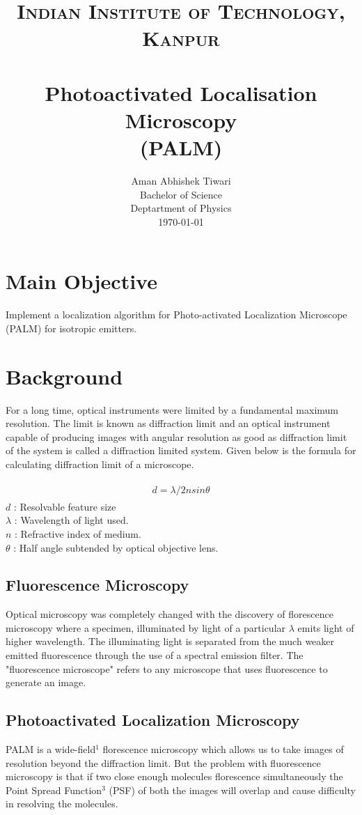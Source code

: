 \documentclass[paper=a4, fontsize=11pt]{scrartcl}
\title{
		\usefont{OT1}{bch}{b}{n}
		\normalfont \normalsize \textsc{Indian Institute of Technology, Kanpur} \\ [25pt]
		\horrule{0.5pt} \\[0.4cm]
		\huge Photoactivated Localisation Microscopy \\ (PALM)
		\horrule{2pt} \\[0.5cm]
}
\author{
		\normalfont 								\normalsize
        Aman Abhishek Tiwari \\ [-3pt] 
        Bachelor of Science \\ [-3pt]
        Deptartment of Physics \\ [-3pt]
        \today
}
\date{}
\numberwithin{equation}{section}		%
\numberwithin{figure}{section}			%
\numberwithin{table}{section}				%
\begin{document}
\maketitle
\section{Main Objective}
Implement a localization algorithm for Photo-activated Localization Microscope (PALM)
for isotropic emitters.

\section {Background}
For a long time, optical instruments were limited by a fundamental maximum resolution. The limit is known as diffraction limit and an optical instrument capable of producing images with angular resolution as good as diffraction limit of the system is called a diffraction limited system. Given below is the formula for calculating diffraction limit of a microscope.

\begin{align}
	\begin{split}
d = \lambda / 2 n sin\theta
	\end{split}
\end{align}
$d$ : Resolvable feature size \\
$\lambda$ : Wavelength of light used. \\
$n$ : Refractive index of medium. \\
$\theta$ : Half angle subtended by optical objective lens. \\

\subsection{Fluorescence Microscopy}
Optical microscopy was completely changed with the discovery of florescence microscopy
where a specimen, illuminated by light of a particular $\lambda$ emits light of higher wavelength. The illuminating light is separated from the much weaker emitted fluorescence through the use of a spectral emission filter. The "fluorescence microscope" refers to any microscope that uses fluorescence to generate an image.

\subsection{Photoactivated Localization Microscopy}
PALM is a wide-field$^1$ florescence microscopy which allows us to take images of resolution beyond the diffraction limit. But the problem with fluorescence microscopy is that if two close enough molecules florescence simultaneously the Point Spread Function$^3$ (PSF) of both the images will overlap and cause difficulty in resolving the molecules. \\
\end{document}
